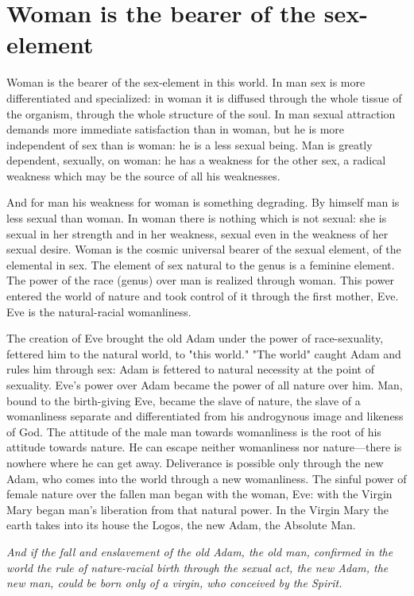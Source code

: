 \section{Woman is the bearer of the sex-element}

\begin{quotationx}
Woman is the bearer of the sex-element in this world. In man sex is more differentiated and specialized: in woman it is diffused through the whole tissue of the organism, through the whole structure of the soul. In man sexual attraction demands more immediate satisfaction than in woman, but he is more independent of sex than is woman: he is a less sexual being. Man is greatly dependent, sexually, on woman: he has a weakness for the other sex, a radical weakness which may be the source of all his weaknesses.

And for man his weakness for woman is something degrading. By himself man is less sexual than woman. In woman there is nothing which is not sexual: she is sexual in her strength and in her weakness, sexual even in the weakness of her sexual desire. Woman is the cosmic universal bearer of the sexual element, of the elemental in sex. The element of sex natural to the genus is a feminine element. The power of the race (genus) over man is realized through woman. This power entered the world of nature and took control of it through the first mother, Eve. Eve is the natural-racial womanliness.

The creation of Eve brought the old Adam under the power of race-sexuality, fettered him to the natural world, to "this world." "The world" caught Adam and rules him through sex: Adam is fettered to natural necessity at the point of sexuality. Eve's power over Adam became the power of all nature over him. Man, bound to the birth-giving Eve, became the slave of nature, the slave of a womanliness separate and differentiated from his androgynous image and likeness of God. The attitude of the male man towards womanliness is the root of his attitude towards nature. He can escape neither womanliness nor nature---there is nowhere where he can get away. Deliverance is possible only through the new Adam, who comes into the world through a new womanliness. The sinful power of female nature over the fallen man began with the woman, Eve: with the Virgin Mary began man's liberation from that natural power. In the Virgin Mary the earth takes into its house the Logos, the new Adam, the Absolute Man.

\emph{And if the fall and enslavement of the old Adam, the old man, confirmed in the world the rule of nature-racial birth through the sexual act, the new Adam, the new man, could be born only of a virgin, who conceived by the Spirit.}


\end{quotationx}
